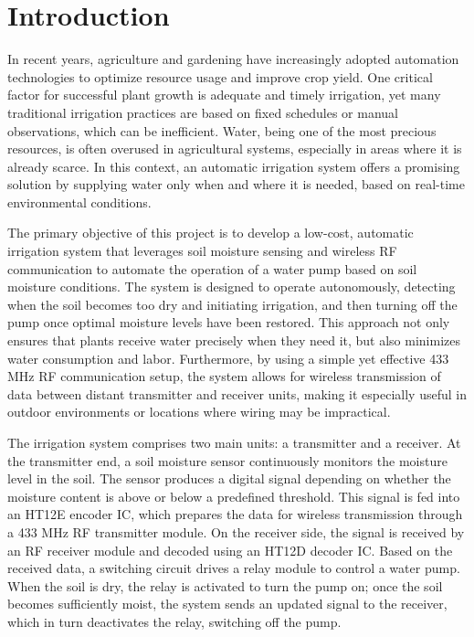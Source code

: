 \chapter{Introduction}
\setlength\parindent{1cm}

In recent years, agriculture and gardening have increasingly adopted automation technologies to optimize resource usage and improve crop yield. One critical factor for successful plant growth is adequate and timely irrigation, yet many traditional irrigation practices are based on fixed schedules or manual observations, which can be inefficient. Water, being one of the most precious resources, is often overused in agricultural systems, especially in areas where it is already scarce. In this context, an automatic irrigation system offers a promising solution by supplying water only when and where it is needed, based on real-time environmental conditions.

The primary objective of this project is to develop a low-cost, automatic irrigation system that leverages soil moisture sensing and wireless RF communication to automate the operation of a water pump based on soil moisture conditions. The system is designed to operate autonomously, detecting when the soil becomes too dry and initiating irrigation, and then turning off the pump once optimal moisture levels have been restored. This approach not only ensures that plants receive water precisely when they need it, but also minimizes water consumption and labor. Furthermore, by using a simple yet effective 433 MHz RF communication setup, the system allows for wireless transmission of data between distant transmitter and receiver units, making it especially useful in outdoor environments or locations where wiring may be impractical.

The irrigation system comprises two main units: a transmitter and a receiver. At the transmitter end, a soil moisture sensor continuously monitors the moisture level in the soil. The sensor produces a digital signal depending on whether the moisture content is above or below a predefined threshold. This signal is fed into an HT12E encoder IC, which prepares the data for wireless transmission through a 433 MHz RF transmitter module. On the receiver side, the signal is received by an RF receiver module and decoded using an HT12D decoder IC. Based on the received data, a switching circuit drives a relay module to control a water pump. When the soil is dry, the relay is activated to turn the pump on; once the soil becomes sufficiently moist, the system sends an updated signal to the receiver, which in turn deactivates the relay, switching off the pump.

